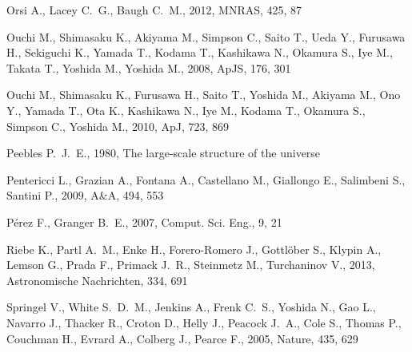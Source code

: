 \documentclass[usenatbib]{mn2e}
\newcommand{\apj}{ApJ}
\newcommand{\apjs}{ApJS}
\newcommand{\mnras}{MNRAS}
\newcommand{\aap}{A\&A}
\newcommand{\nat}{Nature}
\begin{document}
{\begin{thebibliography}{}
{Orsi} A.,  {Lacey} C.~G.,    {Baugh} C.~M.,  2012, \mnras, 425, 87

{Ouchi} M.,  {Shimasaku} K.,  {Akiyama} M.,  {Simpson} C.,  {Saito} T.,  {Ueda}
  Y.,  {Furusawa} H.,  {Sekiguchi} K.,  {Yamada} T.,  {Kodama} T.,  {Kashikawa}
  N.,  {Okamura} S.,  {Iye} M.,  {Takata} T.,  {Yoshida} M.,    {Yoshida} M.,
  2008, \apjs, 176, 301

{Ouchi} M.,  {Shimasaku} K.,  {Furusawa} H.,  {Saito} T.,  {Yoshida} M.,
  {Akiyama} M.,  {Ono} Y.,  {Yamada} T.,  {Ota} K.,  {Kashikawa} N.,  {Iye} M.,
   {Kodama} T.,  {Okamura} S.,  {Simpson} C.,    {Yoshida} M.,  2010, \apj,
  723, 869

{Peebles} P.~J.~E.,  1980, {The large-scale structure of the universe}

{Pentericci} L.,  {Grazian} A.,  {Fontana} A.,  {Castellano} M.,  {Giallongo}
  E.,  {Salimbeni} S.,    {Santini} P.,  2009, \aap, 494, 553

P\'erez F.,  Granger B.~E.,  2007, {C}omput. {S}ci. {E}ng., 9, 21

Riebe K.,  Partl A.~M.,  Enke H.,  Forero-Romero J.,  Gottlöber S.,  Klypin
  A.,  Lemson G.,  Prada F.,  Primack J.~R.,  Steinmetz M.,    Turchaninov V.,
  2013, Astronomische Nachrichten, 334, 691

{Springel} V.,  {White} S.~D.~M.,  {Jenkins} A.,  {Frenk} C.~S.,  {Yoshida} N.,
   {Gao} L.,  {Navarro} J.,  {Thacker} R.,  {Croton} D.,  {Helly} J.,
  {Peacock} J.~A.,  {Cole} S.,  {Thomas} P.,  {Couchman} H.,  {Evrard} A.,
  {Colberg} J.,    {Pearce} F.,  2005, \nat, 435, 629


\end{thebibliography}}
\end{document}
